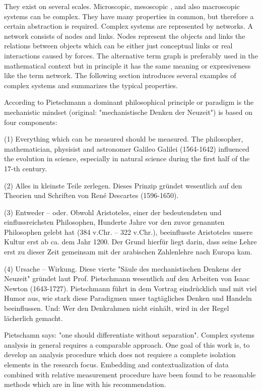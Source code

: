 \documentclass[a4paper,10pt]{scrbook}
\begin{document}
%

 They exist on several scales. Microscopic, mesoscopic , and also macroscopic systems can be complex. They have many properties in common, but therefore a certain abstraction is required. 
Complex systems are represented by networks. A network consists of nodes and links. Nodes represent the objects and links the relations between objects which can be either just conceptual links or real interactions caused by forces. The alternative term graph is preferably used in the mathematical context but in principle it has the same meaning or expresiveness like the term network.
The following section introduces several examples of complex systems and summarizes the typical properties. 

According to Pietschmann \cite{Pietschmann2011} a dominant philosophical principle or paradigm is the mechanistic mindset (original: "mechanistische Denken der Neuzeit") is based on four components:

(1) Everything which can be measured should be measured. The philosopher, mathematician, physisist and astronomer Galileo Galilei (1564-1642) influenced the evolution in science, especially in natural science during the first half of the 17-th century.

(2) Alles in kleinste Teile zerlegen. Dieses Prinzip gründet wesentlich auf den Theorien und Schriften von René Descartes (1596-1650).

(3) Entweder -- oder. Obwohl Aristoteles, einer der bedeutendsten und einflussreichsten Philosophen, Hunderte Jahre vor den zuvor genannten Philosophen gelebt hat (384 v.Chr. -- 322 v.Chr.), beeinflusste Aristoteles unsere Kultur erst ab ca. dem Jahr 1200. Der Grund hierfür liegt darin, dass seine Lehre erst zu dieser Zeit gemeinsam mit der arabischen Zahlenlehre nach Europa kam.

(4) Ursache -- Wirkung. Diese vierte "Säule des mechanistischen Denkens der Neuzeit" gründet laut Prof. Pietschmann wesentlich auf den Arbeiten von Isaac Newton (1643-1727). Pietschmann führt in dem Vortrag eindrücklich und mit viel Humor aus, wie stark diese Paradigmen unser tagtägliches Denken und Handeln beeinflussen. Und: Wer den Denkrahmen nicht einhält, wird in der Regel lächerlich gemacht.

Pietschamn says: "one should differentiate without separation". Complex systems analysis in general requires a comparable approach. One goal of this work is, to develop an analysis
procedure which does not requiere a complete isolation elements in the research focus. Embedding and contextualization of data combined with relative measurement procedure have been found to be reasonable methods which are in line with his recommendation.
\end{document}
